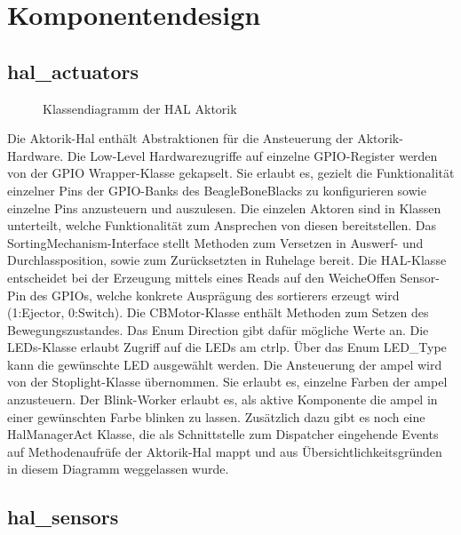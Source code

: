 \section{Komponentendesign}\label{sec:komponentendesign}

\subsection{hal\_actuators}\label{subsec:hal_actuators}

\begin{figure}
    \caption{Klassendiagramm der HAL Aktorik}
    \label{fig:cd-hal}
\end{figure}

Die Aktorik-Hal enthält Abstraktionen für die Ansteuerung der Aktorik-Hardware.
Die Low-Level Hardwarezugriffe auf einzelne GPIO-Register werden von der GPIO Wrapper-Klasse gekapselt.
Sie erlaubt es, gezielt die Funktionalität einzelner Pins der GPIO-Banks des BeagleBoneBlacks zu
konfigurieren sowie einzelne Pins anzusteuern und auszulesen. Die einzelen Aktoren sind in Klassen unterteilt,
welche Funktionalität zum Ansprechen von diesen bereitstellen.
Das SortingMechanism-Interface stellt Methoden zum Versetzen in Auswerf- und Durchlassposition,
sowie zum Zurücksetzten in Ruhelage bereit. Die HAL-Klasse entscheidet bei der Erzeugung mittels
eines Reads auf den WeicheOffen Sensor-Pin des GPIOs, welche konkrete Ausprägung des \gls{sortierer}s erzeugt wird
(1:Ejector, 0:Switch).
Die CBMotor-Klasse enthält Methoden zum Setzen des Bewegungszustandes. Das Enum Direction gibt dafür mögliche Werte an.
Die LEDs-Klasse erlaubt Zugriff auf die LEDs am \gls{ctrlp}. Über das Enum LED\_Type kann die gewünschte LED ausgewählt werden.
Die Ansteuerung der \gls{ampel} wird von der Stoplight-Klasse übernommen. Sie erlaubt es, einzelne Farben der \gls{ampel} anzusteuern.
Der Blink-Worker erlaubt es, als aktive Komponente die \gls{ampel} in einer gewünschten Farbe blinken zu lassen.
Zusätzlich dazu gibt es noch eine HalManagerAct Klasse, die als Schnittstelle zum Dispatcher eingehende Events auf Methodenaufrüfe der Aktorik-Hal
mappt und aus Übersichtlichkeitsgründen in diesem Diagramm weggelassen wurde.

\subsection{hal\_sensors}\label{subsec:hal_sensors}

